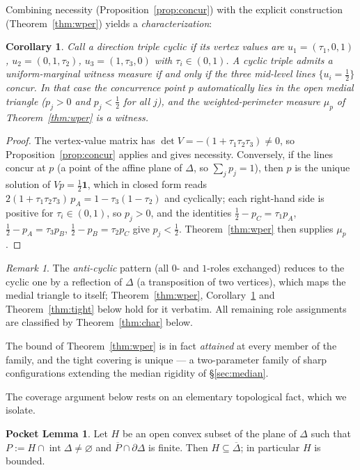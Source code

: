 \documentclass[11pt,reqno]{amsart}
\theoremstyle{plain}
\newtheorem{corollary}[theorem]{Corollary}
\theoremstyle{definition}
\newtheorem*{pocketlemma}{Pocket Lemma}
\theoremstyle{remark}
\newtheorem{remark}[theorem]{Remark}
\begin{document}
Combining necessity (Proposition~\ref{prop:concur}) with the explicit construction
(Theorem~\ref{thm:wper}) yields a \emph{characterization}:
\begin{corollary}\label{cor:iff}
Call a direction triple \emph{cyclic} if its vertex values are
$u_1=(\tau_1,0,1)$, $u_2=(0,1,\tau_2)$, $u_3=(1,\tau_3,0)$ with
$\tau_i\in(0,1)$. A cyclic triple admits a uniform-marginal witness measure if and
only if the three mid-level lines $\{u_i=\tfrac12\}$ concur. In that case the
concurrence point $p$ automatically lies in the open medial triangle
($p_j>0$ and $p_j<\tfrac12$ for all $j$), and the weighted-perimeter measure
$\mu_p$ of Theorem~\ref{thm:wper} is a witness.
\end{corollary}
\begin{proof}
The vertex-value matrix has $\det V=-(1+\tau_1\tau_2\tau_3)\ne0$, so
Proposition~\ref{prop:concur} applies and gives necessity. Conversely, if the lines
concur at $p$ (a point of the affine plane of $\Delta$, so $\sum_jp_j=1$), then $p$
is the unique solution of $Vp=\tfrac12\mathbf1$, which in closed form reads
$2(1+\tau_1\tau_2\tau_3)\,p_A=1-\tau_3(1-\tau_2)$ and cyclically; each right-hand
side is positive for $\tau_i\in(0,1)$, so $p_j>0$, and the identities
$\tfrac12-p_C=\tau_1p_A$, $\tfrac12-p_A=\tau_3p_B$, $\tfrac12-p_B=\tau_2p_C$ give
$p_j<\tfrac12$. Theorem~\ref{thm:wper} then supplies $\mu_p$.
\end{proof}
\begin{remark}
The \emph{anti-cyclic} pattern (all $0$- and $1$-roles exchanged) reduces to the
cyclic one by a reflection of $\Delta$ (a transposition of two vertices), which
maps the medial triangle to itself; Theorem~\ref{thm:wper},
Corollary~\ref{cor:iff} and Theorem~\ref{thm:tight} below hold for it verbatim.
All remaining role assignments are classified by Theorem~\ref{thm:char} below.
\end{remark}

The bound of Theorem~\ref{thm:wper} is in fact \emph{attained} at every member
of the family, and the tight covering is unique --- a two-parameter family of
sharp configurations extending the median rigidity of \S\ref{sec:median}.

The coverage argument below rests on an elementary topological fact, which we
isolate.

\begin{pocketlemma}
Let $H$ be an open convex subset of the plane of $\Delta$ such that
$P:=H\cap\operatorname{int}\Delta\ne\varnothing$ and
$\overline P\cap\partial\Delta$ is finite. Then $H\subseteq\overline\Delta$; in
particular $H$ is bounded.
\end{pocketlemma}
\end{document}
